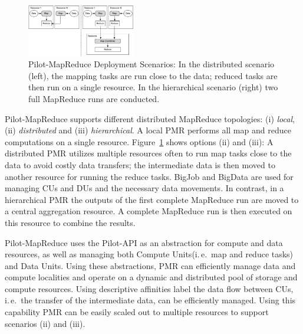\documentclass{acm_proc_article-sp}
\newcommand{\jhanote}[1]{ {\textcolor{red} { ***SJ: #1 }}}
\newcommand{\alnote}[1]{ {\textcolor{blue} { ***andreL: #1 }}}
\newcommand{\alnote}[1]{}
\newcommand{\jhanote}[1]{}
\newcommand{\upp}{\vspace*{-0.5em}}
\newcommand{\pilotmapreduce}{Pilot-MapReduce\xspace}
\newcommand{\computeunits}{Compute Units\xspace}
\newcommand{\dataunits}{Data Units\xspace}
\begin{document}
\begin{figure}
	\upp
	\centering
	\includegraphics[width=0.42\textwidth]{figures/distributed_hierachical.pdf}
	\caption{\pilotmapreduce Deployment Scenarios: In the
          distributed scenario (left), the mapping tasks are run close
          to the data; reduced tasks are then run on a single
          resource. In the hierarchical scenario (right) two full
          MapReduce runs are
          conducted. \label{fid:distributed-mapreduce-overview}\upp\upp}
\end{figure}


\pilotmapreduce supports different distributed MapReduce topologies:
(i) \emph{local}, (ii) \emph{distributed} and (iii)
\emph{hierarchical}. A local PMR performs all map and reduce
computations on a single resource.
Figure~\ref{fid:distributed-mapreduce-overview} shows options (ii) and
(iii): A distributed PMR utilizes multiple resources often to run map
tasks close to the data to avoid costly data transfers; the
intermediate data is then moved to another resource for running the
reduce tasks. BigJob and BigData are used for managing CUs and DUs and
the necessary data movements. In contrast, in a hierarchical PMR the
outputs of the first complete MapReduce run are moved to a central
aggregation resource. A complete MapReduce run is then executed on
this resource to combine the results. %


\pilotmapreduce uses the Pilot-API as an abstraction for compute and data
resources, as well as managing both \computeunits (i.\,e.\ map and reduce tasks)
and \dataunits. Using these abstractions, PMR can efficiently manage data and
compute localities and operate on a dynamic and distributed pool of storage and
compute resources. Using descriptive affinities label the data flow between CUs,
i.\,e.\ the transfer of the intermediate data, can be efficiently managed. Using
this capability PMR can be easily scaled out to multiple resources to support
scenarios (ii) and (iii).
\end{document}
